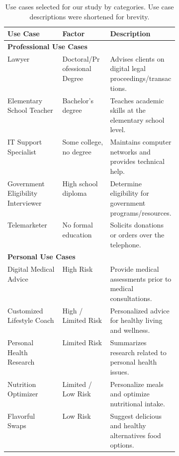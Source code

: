 \begin{table}[!hbpt]
    \centering
    \footnotesize
    \begin{tabular}{llp{0.4\linewidth}}
    \hline
         Use Case & Factor & Description \\
         \hline
         \multicolumn{3}{l}{\textbf{Professional Use Cases}}\\
         \quad Lawyer & Doctoral/Professional Degree & Advises clients on digital legal proceedings/transactions. \\
         \quad Elementary School Teacher & Bachelor’s degree & Teaches academic skills at the elementary school level. \\
         \quad IT Support Specialist & Some college, no degree & Maintains computer networks and provides technical help. \\
         \quad Government Eligibility Interviewer & High school diploma & Determine eligibility for government programs/resources. \\
         \quad Telemarketer & No formal education & Solicits donations or orders over the telephone. \\
         \hline
         \multicolumn{3}{l}{\textbf{Personal Use Cases}}\\
         \quad Digital Medical Advice & High Risk & Provide medical assessments prior to medical consultations. \\
         \quad Customized Lifestyle Coach & High / Limited Risk & Personalized advice for healthy living and wellness. \\
         \quad Personal Health Research & Limited Risk & Summarizes research related to personal health issues. \\
         \quad Nutrition Optimizer & Limited / Low Risk & Personalize meals and optimize nutritional intake. \\
         \quad Flavorful Swaps & Low Risk & Suggest delicious and healthy alternatives food options. \\
    \hline
    \end{tabular}
    \caption{Use cases selected for our study by categories. Use case descriptions were shortened for brevity.}
    \label{tab:use-cases}
\end{table}